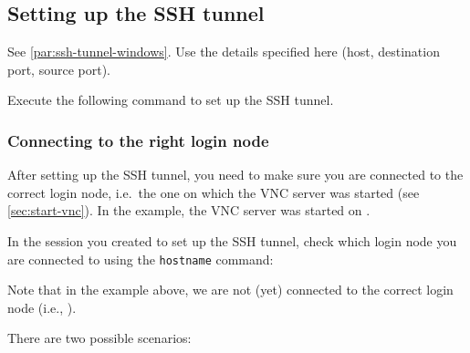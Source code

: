 \subsection{Setting up the SSH tunnel}
\label{sec:ssh-tunnel-vnc}

\ifwindows
See \autoref{par:ssh-tunnel-windows}. Use the details specified here (host, destination port,
source port).
\else

Execute the following command to set up the SSH tunnel.\\

\begin{prompt}
\end{prompt}
\fi

\subsubsection{Connecting to the right login node}

After setting up the SSH tunnel, you need to make sure you are connected to the correct login node,
i.e.\ the one on which the VNC server was started (see \autoref{sec:start-vnc}). In the example,
the VNC server was started on \texttt{\loginhost}.

In the session you created to set up the SSH tunnel, check which login node you are connected to
using the \lstinline|hostname| command:

\begin{prompt}
\end{prompt}

Note that in the example above, we are not (yet) connected to the correct login node (i.e., \texttt{\loginhost}).

There are two possible scenarios:

